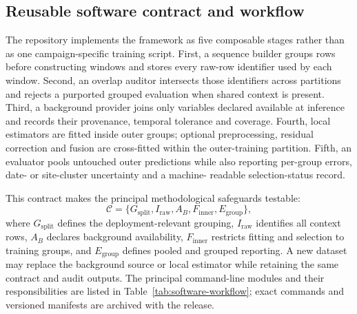 \documentclass[review,12pt,authoryear]{elsarticle}
\begin{document}
\subsection{Reusable software contract and workflow}

The repository implements the framework as five composable stages rather than
as one campaign-specific training script. First, a sequence builder groups rows
before constructing windows and stores every raw-row identifier used by each
window. Second, an overlap auditor intersects those identifiers across
partitions and rejects a purported grouped evaluation when shared context is
present. Third, a background provider joins only variables declared available
at inference and records their provenance, temporal tolerance and coverage.
Fourth, local estimators are fitted inside outer groups; optional preprocessing,
residual correction and fusion are cross-fitted within the outer-training
partition. Fifth, an evaluator pools untouched outer predictions while also
reporting per-group errors, date- or site-cluster uncertainty and a machine-
readable selection-status record.

This contract makes the principal methodological safeguards testable:
\begin{equation}
 \mathcal{C}=\{G_{\mathrm{split}},I_{\mathrm{raw}},A_B,
 F_{\mathrm{inner}},E_{\mathrm{group}}\},
 \label{eq:software-contract}
\end{equation}
where $G_{\mathrm{split}}$ defines the deployment-relevant grouping,
$I_{\mathrm{raw}}$ identifies all context rows, $A_B$ declares background
availability, $F_{\mathrm{inner}}$ restricts fitting and selection to training
groups, and $E_{\mathrm{group}}$ defines pooled and grouped reporting. A new
dataset may replace the background source or local estimator while retaining
the same contract and audit outputs. The principal command-line modules and
their responsibilities are listed in Table~\ref{tab:software-workflow}; exact
commands and versioned manifests are archived with the release.
\end{document}
